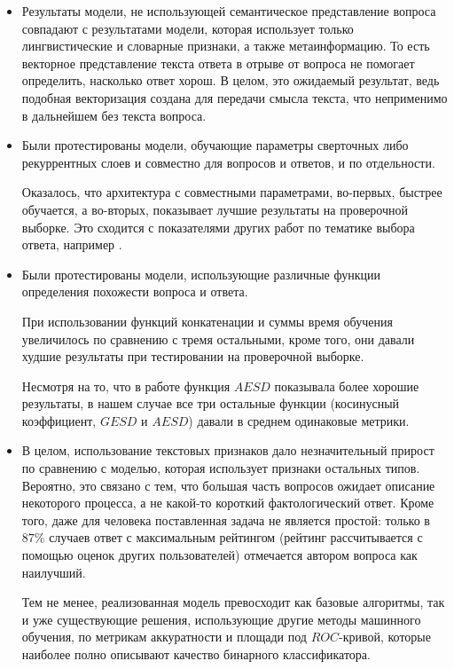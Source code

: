 \documentclass[../diploma.tex]{subfiles}
\begin{document}
	\begin{itemize}
	
		\item
		Результаты модели, не использующей семантическое представление вопроса совпадают с результатами модели, 
		которая использует только лингвистические и словарные признаки, а также метаинформацию.
		То есть векторное представление текста ответа в отрыве от вопроса не помогает определить, насколько ответ хорош.
		В целом, это ожидаемый результат, ведь подобная векторизация создана для передачи смысла текста, что неприменимо в дальнейшем без текста вопроса.

		\item
		Были протестированы модели, обучающие параметры сверточных либо рекуррентных слоев и совместно для вопросов и ответов, и по отдельности.

		Оказалось, что архитектура с совместными параметрами, во-первых, быстрее обучается, а во-вторых, 
		показывает лучшие результаты на проверочной выборке.
		Это сходится с показателями других работ по тематике выбора ответа, например \cite{article:answer_selection}.

		\item
		Были протестированы модели, использующие различные функции определения похожести вопроса и ответа.

		При использовании функций конкатенации и суммы время обучения увеличилось по сравнению с тремя остальными, 
		кроме того, они давали худшие результаты при тестировании на проверочной выборке.

		Несмотря на то, что в работе \cite{article:answer_selection} функция $AESD$ показывала более хорошие результаты,
		в нашем случае все три остальные функции (косинусный коэффициент, $GESD$ и $AESD$) давали в среднем одинаковые метрики.

		\item
		В целом, использование текстовых признаков дало незначительный прирост по сравнению с моделью, которая использует признаки остальных типов.
		Вероятно, это связано с тем, что большая часть вопросов ожидает описание некоторого процесса, 
		а не какой-то короткий фактологический ответ.
		Кроме того, даже для человека поставленная задача не является простой: 
		только в $87 \%$ случаев ответ с максимальным рейтингом (рейтинг рассчитывается с помощью оценок других пользователей) отмечается автором вопроса как наилучший.

		Тем не менее, реализованная модель превосходит как базовые алгоритмы, так и уже существующие решения, использующие другие методы машинного обучения, 
		по метрикам аккуратности и площади под $ROC$-кривой, которые наиболее полно описывают качество бинарного классификатора.
	\end{itemize}
\end{document}
